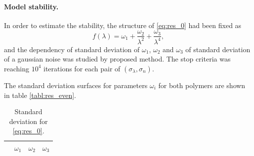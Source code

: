 \documentclass[11pt,a4paper]{article}
\theoremstyle{definition}
\begin{document}
\paragraph{Model stability.}

In order to estimate the stability, the structure of \eqref{eq:res_0} had been fixed as
\[
  f(\lambda) = \omega_1 + \frac{\omega_2}{\lambda^2} + \frac{\omega_3}{\lambda^4},
\]
and the dependency of standard deviation of $\omega_1$, $\omega_2$ and $\omega_3$
of standard deviation of a gaussian noise was studied by proposed method.
The stop criteria was reaching $10^4$ iterations for each pair of $(\sigma_{\lambda}, \sigma_n)$.

The standard deviation surfaces for parameters $\omega_i$ for both polymers are shown in
table \ref{tabl:res_even}.

\begin{table}[h]
  \centering
  \footnotesize
  \caption{Standard deviation for \eqref{eq:res_0}.}
  \begin{tabular}{l | c c c}
	  & $\omega_1$ & $\omega_2$ & $\omega_3$ \\ \hline

\end{tabular}
\end{table}
\end{document}

